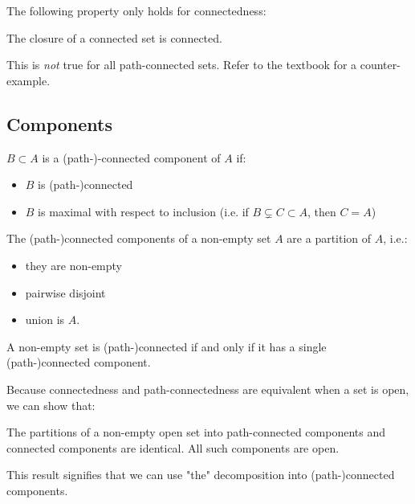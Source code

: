 The following property only holds for connectedness:
\begin{thm*}
    The closure of a connected set is connected.
\end{thm*}

\begin{note}
    This is \emph{not} true for all path-connected sets. Refer to the textbook for a counter-example.
\end{note}

\subsection{Components}
\begin{defi}
    $B\subset A$ is a (path-)-connected component of $A$ if:

    \begin{itemize}
        \item $B$ is (path-)connected
        \item $B$ is maximal with respect to inclusion (i.e. if $B\subsetneq C\subset A$, then $C=A$)
    \end{itemize}
\end{defi}

\begin{thm*}
    The (path-)connected components of a non-empty set $A$ are a partition of $A$, i.e.:
    \begin{itemize}
        \item they are non-empty
        \item pairwise disjoint 
        \item union is $A$.
    \end{itemize}
\end{thm*}

\begin{thm*}
    A non-empty set is (path-)connected if and only if it has a single (path-)connected component.
\end{thm*}

Because connectedness and path-connectedness are equivalent when a set is open, we can show that:

\begin{thm*}
    The partitions of a non-empty open set into path-connected components and connected components are identical. All such components are open.
\end{thm*}

\begin{note}
    This result signifies that we can use "the" decomposition into (path-)connected components.
\end{note}

